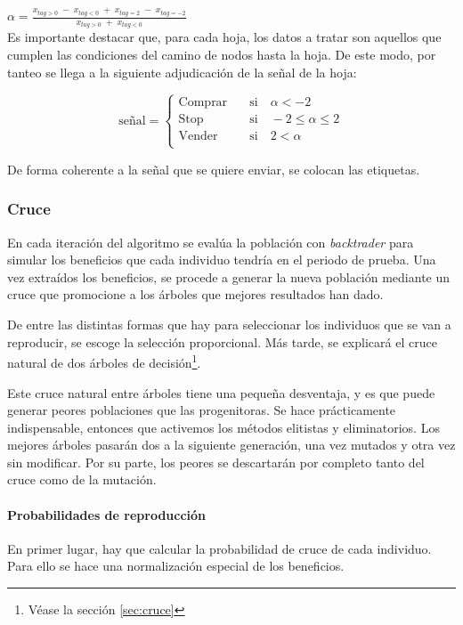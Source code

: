 $\alpha = \frac{x_{tag>0}\; -\; x_{tag<0} \; + \; x_{tag=2} \; -\; x_{tag=-2}}{x_{tag>0}\; + \; x_{tag<0}} $\\


Es importante destacar que, para cada hoja, los datos a tratar son aquellos que cumplen las condiciones del camino de nodos hasta la hoja. De este modo, por tanteo se llega a la siguiente adjudicaci\'on de la se\~nal de la hoja:

\[   
\text{se\~nal} = 
     \begin{cases}
       \text{Comprar} &\quad\text{si}\quad \alpha < -2\\
       \text{Stop} &\quad\text{si}\quad -2 \leq \alpha \leq 2\\
       \text{Vender} &\quad\text{si}\quad 2 < \alpha\\ 
     \end{cases}
\]

De forma coherente a la se\~nal que se quiere enviar, se colocan las etiquetas.

\subsubsection{Cruce}
En cada iteraci\'on del algoritmo se eval\'ua la poblaci\'on con \textit{backtrader} para simular los beneficios que cada individuo tendr\'ia en el periodo de prueba. Una vez extra\'idos los beneficios, se procede a generar la nueva poblaci\'on mediante un cruce que promocione a los \'arboles que mejores resultados han dado.

De entre las distintas formas que hay para seleccionar los individuos que se van a reproducir, se escoge la selecci\'on proporcional. M\'as tarde, se explicar\'a el cruce natural de dos \'arboles de decisi\'on\footnote{V\'ease la secci\'on \ref{sec:cruce}}.

Este cruce natural entre \'arboles tiene una peque\~na desventaja, y es que puede generar peores poblaciones que las progenitoras. Se hace pr\'acticamente indispensable, entonces que activemos los m\'etodos elitistas y eliminatorios. Los mejores \'arboles pasar\'an dos a la siguiente generaci\'on, una vez mutados y otra vez sin modificar. Por su parte, los peores se descartar\'an por completo tanto del cruce como de la mutaci\'on.

\paragraph{Probabilidades de reproducci\'on}
En primer lugar, hay que calcular la probabilidad de cruce de cada individuo. Para ello se hace una normalizaci\'on especial de los beneficios.

